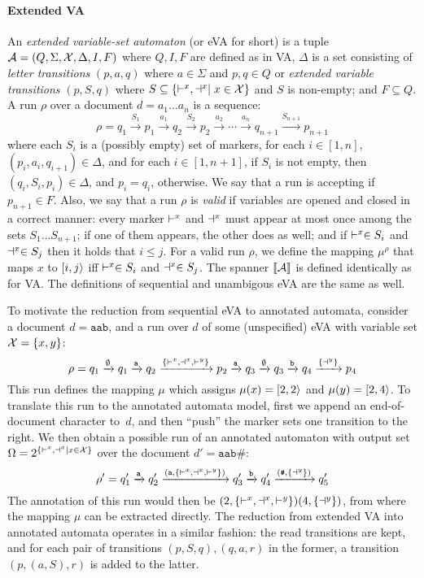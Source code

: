 \paragraph{Extended VA}
An \emph{extended variable-set automaton} (or eVA for short) is a tuple $\mathcal{A} = (Q, \Sigma, \mathcal{X}, \Delta,I, F)$ where $Q,I,F$ are defined as in VA, $\Delta$ is a set consisting of {\it letter transitions} $(p, a, q)$ where $a\in\Sigma$ and $p,q\in Q$ or {\it extended variable transitions} $(p, S, q)$ where $S\subseteq \{\vdash^{x} , \dashv^{x}\mid x\in\mathcal{X}\}$ and $S$ is non-empty; and $F\subseteq Q$. A run $\rho$ over a document $d = a_1\ldots a_n$ is a sequence:
\[
\rho = q_1  \xrightarrow{S_1} p_1 \xrightarrow{a_1} 
q_2  \xrightarrow{S_2} p_2 \xrightarrow{a_2} \cdots 
\xrightarrow{a_n} q_{n+1}  \xrightarrow{S_{n+1}} p_{n+1}
\]
where each $S_i$ is a (possibly empty) set of markers, for each $i\in[1,n]$, $(p_i, a_{i}, q_{i+1})\in \Delta$, and for each $i\in[1,n+1]$, if $S_i$ is not empty, then $(q_i, S_{i}, p_i)\in \Delta$, and $p_i = q_i$, otherwise. We say that a run is accepting if $p_{n+1}\in F$. Also, we say that a run $\rho$ is {\it valid} if variables are opened and closed in a correct manner: every marker $\vdash^{x}$ and $\dashv^{x}$ must appear at most once among the sets $S_1\ldots S_{n+1}$; if one of them appears, the other does as well; and if $\vdash^{x}\in S_i$ and $\dashv^{x}\in S_j$ then it holds that $i\leq j$. For a valid run $\rho$, we define the mapping $\mu^\rho$ that maps $x$ to $[i,j\rangle$ iff $\vdash^{x}\in S_i$ and $\dashv^{x}\in S_j$. The spanner ${\llbracket{\mathcal{A}}\rrbracket}$ is defined identically as for 
VA. The definitions of sequential and unambigous eVA are the same as well.

To motivate the reduction from sequential eVA to annotated automata, consider a document $d = \texttt{aab}$, and a run over $d$ of some (unspecified) eVA with variable set $\mathcal{X} = \{x, y\}$:
\[
\rho = q_1  \xrightarrow{\emptyset} q_1 \xrightarrow{{\tt a}} 
q_2  \xrightarrow{\{\vdash^{x}, \dashv^{x}, \vdash^{y}\}} p_2 \xrightarrow{{\tt a}} 
q_3  \xrightarrow{\emptyset} q_3 \xrightarrow{{\tt b}} 
q_4  \xrightarrow{\{\dashv^{y}\}} p_4
\]
This run defines the mapping $\mu$ which assigns $\mu(x) = [2,2\rangle$ and $\mu(y) = [2,4\rangle$.
To translate this run to the annotated automata model, first we append an end-of-document character to~$d$, and then ``push'' the marker sets one transition to the right. We then obtain a possible run of an annotated automaton with output set $\Omega = 2^{\{\vdash^{x} , \dashv^{x}\mid x\in\mathcal{X}\}}$ over the document $d' = \texttt{aab\#}$:
\[
\rho' = q_1'  \xrightarrow{{\tt a}} 
q_2'  \xrightarrow{({\tt a}, \{\vdash^{x}, \dashv^{x}, \vdash^{y}\})} 
q_3'  \xrightarrow{{\tt b}} 
q_4'  \xrightarrow{(\texttt{\#}, \{\dashv^{y}\})} q_5'
\]
The annotation of this run would then be $(2, \{\vdash^{x}, \dashv^{x}, \vdash^{y}\})(4,\{\dashv^{y}\})$, from where the mapping $\mu$ can be extracted directly. The reduction from extended VA into annotated automata operates in a similar fashion: the read transitions are kept, and for each pair of transitions $(p,S,q), (q, a, r)$ in the former, a transition $(p, (a, S), r)$ is added to the latter.


